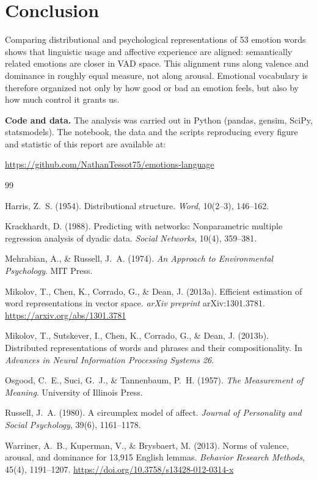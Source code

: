 \documentclass[11pt,a4paper]{article}
\begin{document}
\section{Conclusion}

Comparing distributional and psychological representations of 53 emotion
words shows that linguistic usage and affective experience are aligned:
semantically related emotions are closer in VAD space. This alignment runs
along valence and dominance in roughly equal measure, not along arousal.
Emotional vocabulary is therefore organized not only by how good or bad an
emotion feels, but also by how much control it grants us.

\medskip
\noindent\textbf{Code and data.} The analysis was carried out in Python
(pandas, gensim, SciPy, statsmodels). The notebook, the data and the scripts
reproducing every figure and statistic of this report are available at:
\begin{center}
\small\url{https://github.com/NathanTessot75/emotions-language}
\end{center}

\begin{thebibliography}{99}
\setlength{\itemsep}{1pt}\small

Harris, Z.~S. (1954). Distributional structure. \emph{Word}, 10(2--3),
146--162.

Krackhardt, D. (1988). Predicting with networks: Nonparametric multiple
regression analysis of dyadic data. \emph{Social Networks}, 10(4), 359--381.

Mehrabian, A., \& Russell, J.~A. (1974). \emph{An Approach to Environmental
Psychology}. MIT Press.

Mikolov, T., Chen, K., Corrado, G., \& Dean, J. (2013a). Efficient
estimation of word representations in vector space. \emph{arXiv preprint}
arXiv:1301.3781. \url{https://arxiv.org/abs/1301.3781}

Mikolov, T., Sutskever, I., Chen, K., Corrado, G., \& Dean, J. (2013b).
Distributed representations of words and phrases and their
compositionality. In \emph{Advances in Neural Information Processing
Systems 26}.

Osgood, C.~E., Suci, G.~J., \& Tannenbaum, P.~H. (1957). \emph{The
Measurement of Meaning}. University of Illinois Press.

Russell, J.~A. (1980). A circumplex model of affect. \emph{Journal of
Personality and Social Psychology}, 39(6), 1161--1178.

Warriner, A.~B., Kuperman, V., \& Brysbaert, M. (2013). Norms of valence,
arousal, and dominance for 13,915 English lemmas. \emph{Behavior Research
Methods}, 45(4), 1191--1207. \url{https://doi.org/10.3758/s13428-012-0314-x}

\end{thebibliography}
\end{document}
